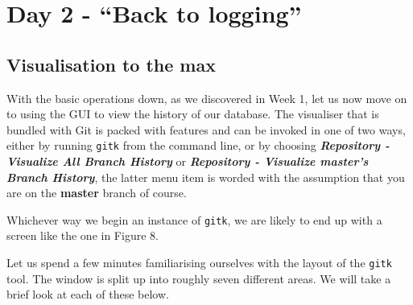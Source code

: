 
\section{Day 2 - ``Back to logging''}
\subsection{Visualisation to the max}
With the basic operations down, as we discovered in Week 1, let us now move on to using the GUI to view the history of our database.
The visualiser that is bundled with Git is packed with features and can be invoked in one of two ways, either by running \texttt{gitk} from the command line, or by choosing \textbf{\emph{Repository - Visualize All Branch History}} or \textbf{\emph{Repository - Visualize master's Branch History}}, the latter menu item is worded with the assumption that you are on the \textbf{master} branch of course.

Whichever way we begin an instance of \texttt{gitk}, we are likely to end up with a screen like the one in Figure 8.


Let us spend a few minutes familiarising ourselves with the layout of the \texttt{gitk} tool.
The window is split up into roughly seven different areas.
We will take a brief look at each of these below.

